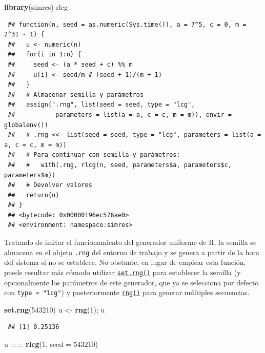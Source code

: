 \documentclass[
  spanish,
  10pt,
]{book}
\newenvironment{Shaded}{\begin{snugshade}}{\end{snugshade}}
\newcommand{\AttributeTok}[1]{\textcolor[rgb]{0.13,0.29,0.53}{#1}}
\newcommand{\DecValTok}[1]{\textcolor[rgb]{0.00,0.00,0.81}{#1}}
\newcommand{\FunctionTok}[1]{\textcolor[rgb]{0.13,0.29,0.53}{\textbf{#1}}}
\newcommand{\NormalTok}[1]{#1}
\newcommand{\OtherTok}[1]{\textcolor[rgb]{0.56,0.35,0.01}{#1}}
\newcommand{\SpecialCharTok}[1]{\textcolor[rgb]{0.81,0.36,0.00}{\textbf{#1}}}
\theoremstyle{break}
\theoremstyle{nonumberplain}
\begin{document}
\begin{Shaded}
\begin{Highlighting}[]
\FunctionTok{library}\NormalTok{(simres)}
\NormalTok{rlcg}
\end{Highlighting}
\end{Shaded}

\begin{verbatim}
 ## function(n, seed = as.numeric(Sys.time()), a = 7^5, c = 0, m = 2^31 - 1) {
 ##   u <- numeric(n)
 ##   for(i in 1:n) {
 ##     seed <- (a * seed + c) %% m
 ##     u[i] <- seed/m # (seed + 1)/(m + 1)
 ##   }
 ##   # Almacenar semilla y parámetros
 ##   assign(".rng", list(seed = seed, type = "lcg",
 ##           parameters = list(a = a, c = c, m = m)), envir = globalenv())
 ##   # .rng <<- list(seed = seed, type = "lcg", parameters = list(a = a, c = c, m = m))
 ##   # Para continuar con semilla y parámetros:
 ##   #   with(.rng, rlcg(n, seed, parameters$a, parameters$c, parameters$m))
 ##   # Devolver valores
 ##   return(u)
 ## }
 ## <bytecode: 0x00000196ec576ae0>
 ## <environment: namespace:simres>
\end{verbatim}

Tratando de imitar el funcionamiento del generador uniforme de R, la semilla se almacena en el objeto \texttt{.rng} del entorno de trabajo y se genera a partir de la hora del sistema si no se establece.
No obstante, en lugar de emplear esta función, puede resultar más cómodo utilizar \href{https://rubenfcasal.github.io/simres/reference/set.rng.html}{\texttt{set.rng()}} para establecer la semilla (y opcionalmente los parámetros de este generador, que ya se selecciona por defecto con \texttt{type\ =\ "lcg"}) y posteriormente \href{https://rubenfcasal.github.io/simres/reference/set.rng.html}{\texttt{rng()}} para generar múltiples secuencias.

\begin{Shaded}
\begin{Highlighting}[]
\FunctionTok{set.rng}\NormalTok{(}\DecValTok{543210}\NormalTok{)}
\NormalTok{u }\OtherTok{\textless{}{-}} \FunctionTok{rng}\NormalTok{(}\DecValTok{1}\NormalTok{); u}
\end{Highlighting}
\end{Shaded}

\begin{verbatim}
 ## [1] 0.25136
\end{verbatim}

\begin{Shaded}
\begin{Highlighting}[]
\NormalTok{u }\SpecialCharTok{==} \FunctionTok{rlcg}\NormalTok{(}\DecValTok{1}\NormalTok{, }\AttributeTok{seed =} \DecValTok{543210}\NormalTok{)}
\end{Highlighting}
\end{Shaded}
\end{document}
